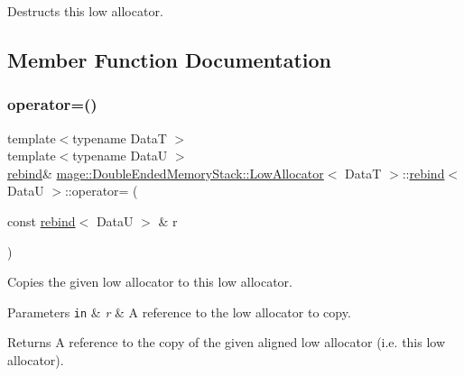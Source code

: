Destructs this low allocator. 

\subsection{Member Function Documentation}
\hypertarget{structmage_1_1_double_ended_memory_stack_1_1_low_allocator_1_1rebind_a6523f389470eb39aac4d876d8bc22469}{}\label{structmage_1_1_double_ended_memory_stack_1_1_low_allocator_1_1rebind_a6523f389470eb39aac4d876d8bc22469} 
\subsubsection{\texorpdfstring{operator=()}{operator=()}\hspace{0.1cm}{\footnotesize\ttfamily [1/2]}}
{\footnotesize\ttfamily template$<$typename DataT $>$ \\
template$<$typename DataU $>$ \\
\hyperlink{structmage_1_1_double_ended_memory_stack_1_1_low_allocator_1_1rebind}{rebind}\& \hyperlink{structmage_1_1_double_ended_memory_stack_1_1_low_allocator}{mage\+::\+Double\+Ended\+Memory\+Stack\+::\+Low\+Allocator}$<$ DataT $>$\+::\hyperlink{structmage_1_1_double_ended_memory_stack_1_1_low_allocator_1_1rebind}{rebind}$<$ DataU $>$\+::operator= (\begin{DoxyParamCaption}\item[{const \hyperlink{structmage_1_1_double_ended_memory_stack_1_1_low_allocator_1_1rebind}{rebind}$<$ DataU $>$ \&}]{r }\end{DoxyParamCaption})\hspace{0.3cm}{\ttfamily [delete]}}

Copies the given low allocator to this low allocator.


\begin{DoxyParams}[1]{Parameters}
\mbox{\tt in}  & {\em r} & A reference to the low allocator to copy. \\
\hline
\end{DoxyParams}
\begin{DoxyReturn}{Returns}
A reference to the copy of the given aligned low allocator (i.\+e. this low allocator). 
\end{DoxyReturn}
\hypertarget{structmage_1_1_double_ended_memory_stack_1_1_low_allocator_1_1rebind_ad09f9f5cfec3b8d6883d4563d180c8a1}{}\label{structmage_1_1_double_ended_memory_stack_1_1_low_allocator_1_1rebind_ad09f9f5cfec3b8d6883d4563d180c8a1} 
